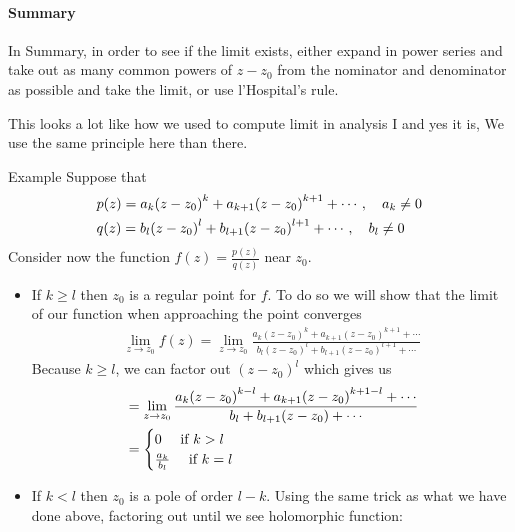 \paragraph{Summary}%
\label{par:Summary}
In Summary, in order to see if the limit exists, either expand in power series and take out as many common powers of $z - z_0$ from the nominator and denominator as possible and take the limit, or use l'Hospital's rule.
\begin{framedremark}
This looks a lot like how we used to compute limit in analysis I and yes it is, We use the same principle here than there.\\
\end{framedremark}
\begin{parag}{Example}
    Suppose that
	\begin{align*} 
		&p\left(z\right) = a_k\left(z - z_0\right)^{k} + a_{k + 1}\left(z - z_0\right)^{k + 1} + \cdots, \mathspace a_k \neq 0\\
		&q\left(z\right) =  b_l\left(z - z_0\right)^{l} + b_{l + 1}\left(z - z_0\right)^{l + 1} + \cdots, \mathspace b_l \neq 0   
	\end{align*}
	Consider now the function $f\left(z\right) = \frac{p\left(z\right)}{q\left(z\right)}$ near $z_0$.
	\begin{itemize}
	    \item If $k \geq l$ then $z_0$ is a regular point for $f$. To do so we will show that the limit of our function when approaching the point converges 
			\begin{align*} 
				\lim_{z  \to z_0} f\left(z\right) = \lim_{z  \to z_0}  \frac{a_k\left( z - z_0\right)^{k} + a_{k + 1}\left(z - z_0\right)^{k + 1} + \cdots}{b_l \left(z - z_0\right)^{l} + b_{l  + 1}\left(z - z_0\right)^{l + 1} + \cdots} 
			\end{align*}
			Because $k \geq l$, we can factor out $\left(z - z_0\right)^{l}$ which gives us 
			\begin{align*} 
				&=  \lim_{z \to z_0} \frac{a_k\left(z - z_0\right)^{k - l} + a_{k+1}\left(z - z_0\right)^{k + 1 - l} + \cdots}{b_l + b_{l +1}\left(z - z_0\right) + \cdots}\\
				&= \begin{cases}
					0 \mathspace \text{ if } k > l	\\
					\frac{a_k}{b_l} \mathspace \text{ if } k= l
				\end{cases}
			\end{align*}
			\item If $k < l$ then $z_0$ is a pole of order $l-k$. Using the same trick as what we have done above, factoring out until we see holomorphic function:

\end{itemize}
\end{parag}
